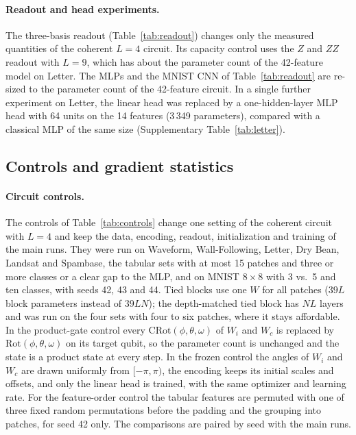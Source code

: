 \documentclass[11pt]{article}
\begin{document}
\paragraph{Readout and head experiments.}
The three-basis readout (Table~\ref{tab:readout}) changes only the measured quantities of the coherent $L=4$ circuit. Its capacity control uses the $Z$ and $ZZ$ readout with $L=9$, which has about the parameter count of the 42-feature model on Letter. The MLPs and the MNIST CNN of Table~\ref{tab:readout} are re-sized to the parameter count of the 42-feature circuit. In a single further experiment on Letter, the linear head was replaced by a one-hidden-layer MLP head with 64 units on the 14 features (3\,349 parameters), compared with a classical MLP of the same size (Supplementary Table~\ref{tab:letter}).

\subsection{Controls and gradient statistics}
\label{sec:meth-controls}

\paragraph{Circuit controls.}
The controls of Table~\ref{tab:controls} change one setting of the coherent circuit with $L=4$ and keep the data, encoding, readout, initialization and training of the main runs. They were run on Waveform, Wall-Following, Letter, Dry Bean, Landsat and Spambase, the tabular sets with at most 15 patches and three or more classes or a clear gap to the MLP, and on MNIST $8\times8$ with 3 vs.\ 5 and ten classes, with seeds 42, 43 and 44. Tied blocks use one $W$ for all patches ($39L$ block parameters instead of $39LN$); the depth-matched tied block has $NL$ layers and was run on the four sets with four to six patches, where it stays affordable. In the product-gate control every $\mathrm{CRot}(\phi,\theta,\omega)$ of $W_i$ and $W_c$ is replaced by $\mathrm{Rot}(\phi,\theta,\omega)$ on its target qubit, so the parameter count is unchanged and the state is a product state at every step. In the frozen control the angles of $W_i$ and $W_c$ are drawn uniformly from $[-\pi,\pi)$, the encoding keeps its initial scales and offsets, and only the linear head is trained, with the same optimizer and learning rate. For the feature-order control the tabular features are permuted with one of three fixed random permutations before the padding and the grouping into patches, for seed 42 only. The comparisons are paired by seed with the main runs.
\end{document}
